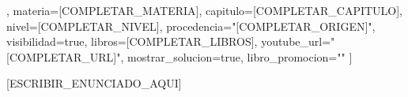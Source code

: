 % 
%

\begin{ejercicio}[
  id=[COMPLETAR_ID],                    %
  materia=[COMPLETAR_MATERIA],          %
  capitulo=[COMPLETAR_CAPITULO],        %
  nivel=[COMPLETAR_NIVEL],              %
  procedencia="[COMPLETAR_ORIGEN]",     %
  visibilidad=true,                     %
  libros={[COMPLETAR_LIBROS]},          %
  youtube_url="[COMPLETAR_URL]",        %
  mostrar_solucion=true,                %
  libro_promocion=""                    %
]
% 

[ESCRIBIR_ENUNCIADO_AQUI]

% 
% 
% 


\end{ejercicio}
